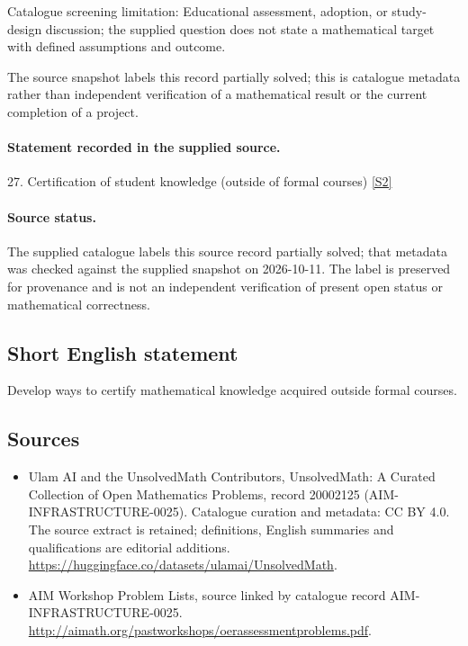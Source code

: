 \documentclass[11pt]{article}
\begin{document}
Catalogue screening limitation: Educational assessment, adoption, or study-design discussion; the supplied question does not state a mathematical target with defined assumptions and outcome.

The source snapshot labels this record partially solved; this is catalogue metadata rather than independent verification of a mathematical result or the current completion of a project.
\paragraph{Statement recorded in the supplied source.}
27. Certification of student knowledge (outside of formal courses) \href{http://aimath.org/pastworkshops/oerassessmentproblems.pdf}{[S2]}
\paragraph{Source status.}
The supplied catalogue labels this source record partially solved; that metadata was checked against the supplied snapshot on 2026-10-11. The label is preserved for provenance and is not an independent verification of present open status or mathematical correctness.
\subsection{Short English statement}
Develop ways to certify mathematical knowledge acquired outside formal courses.
\subsection{Sources}
\begin{itemize}
\item[S1] Ulam AI and the UnsolvedMath Contributors, UnsolvedMath: A Curated Collection of Open Mathematics Problems, record 20002125 (AIM-INFRASTRUCTURE-0025). Catalogue curation and metadata: CC BY 4.0. The source extract is retained; definitions, English summaries and qualifications are editorial additions.
\url{https://huggingface.co/datasets/ulamai/UnsolvedMath}.
\item[S2] AIM Workshop Problem Lists, source linked by catalogue record AIM-INFRASTRUCTURE-0025.
\url{http://aimath.org/pastworkshops/oerassessmentproblems.pdf}.
\end{itemize}
\end{document}
